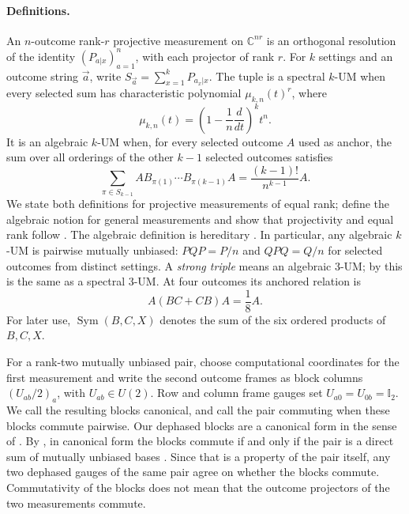 \documentclass[11pt]{article}
\newcommand{\id}{\mathbb I}
\newcommand{\Sym}{\operatorname{Sym}}
\begin{document}
\paragraph{Definitions.}
An $n$-outcome rank-$r$ projective measurement on $\mathbb C^{nr}$ is
an orthogonal resolution of the identity $(P_{a|x})_{a=1}^n$, with each
projector of rank $r$. For $k$ settings and an outcome string $\vec a$,
write $S_{\vec a}=\sum_{x=1}^kP_{a_x|x}$.
The tuple is a spectral $k$-UM when every selected sum has
characteristic polynomial $\mu_{k,n}(t)^r$, where
\[
 \mu_{k,n}(t)=\left(1-\frac1n\frac{d}{dt}\right)^kt^n.
\]
It is an algebraic $k$-UM when, for every selected outcome $A$ used
as anchor, the sum over all orderings of the other $k-1$ selected
outcomes satisfies
\[
 \sum_{\pi\in S_{k-1}} A B_{\pi(1)}\cdots B_{\pi(k-1)} A
 =\frac{(k-1)!}{n^{k-1}}A.
\]
We state both definitions for projective measurements of equal rank;
\cite{DF} define the algebraic notion for general measurements and show
that projectivity and equal rank follow \cite[Thm.~3(1)]{DF}.
The algebraic definition is hereditary \cite[Thm.~3(1)]{DF}. In particular, any algebraic
$k$-UM is pairwise mutually unbiased:
$PQP=P/n$ and $QPQ=Q/n$ for selected outcomes from distinct settings.
A \emph{strong triple} means an algebraic 3-UM; by \cite[Thm.~3(5)]{DF}
this is the same as a spectral 3-UM. At four outcomes its
anchored relation is
\begin{equation}\label{eq:triple}
 A(BC+CB)A=\frac18 A.
\end{equation}
For later use, $\Sym(B,C,X)$ denotes the sum of the six ordered products
of $B,C,X$.

For a rank-two mutually unbiased pair, choose computational coordinates
for the first measurement and write the second outcome frames as block
columns $(U_{ab}/2)_a$, with $U_{ab}\in U(2)$. Row and column frame
gauges set $U_{a0}=U_{0b}=\id_2$. We call the resulting blocks canonical,
and call the pair commuting when these blocks commute pairwise.
Our dephased blocks are a canonical form in the sense of \cite{FKN}.
By \cite[Prop.~2.8]{FKN}, in canonical form the blocks commute if and only
if the pair is a direct sum of mutually unbiased bases
\cite[Def.~2.7]{FKN}. Since that is a property of the pair itself, any two
dephased gauges of the same pair agree on whether the blocks commute.
Commutativity of the blocks does not mean that the outcome projectors of
the two measurements commute.
\end{document}
